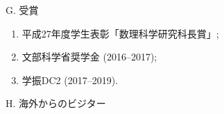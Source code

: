 \documentclass[a4j,twocolumn]{jarticle}
\begin{document}

\vspace{0.2cm}
\noindent
G. 受賞

\vspace{0.1cm}
\begin{enumerate}
	\item 平成27年度学生表彰「数理科学研究科長賞」;
	\item 文部科学省奨学金 (2016--2017);
	\item 学振DC2 (2017--2019).
\end{enumerate}




\vspace{0.2cm}
\noindent

H. 海外からのビジター



\end{document}
